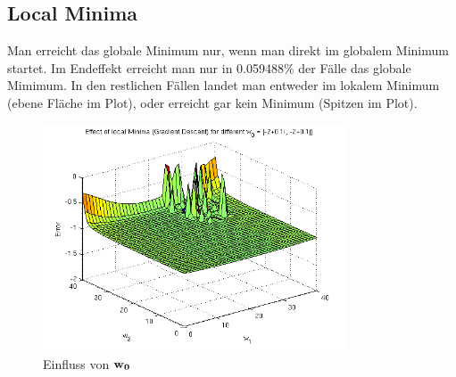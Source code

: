 \clearpage
\newpage
\subsection{Local Minima}

Man erreicht das globale Minimum nur, wenn man direkt im globalem Minimum startet.
Im Endeffekt erreicht man nur in 0.059488\% der Fälle das globale Mimimum. In den restlichen Fällen landet man
entweder im lokalem Minimum (ebene Fläche im Plot), oder erreicht gar kein Minimum (Spitzen im Plot).


\begin{figure}[h!]
  \centering
  \includegraphics[width=0.8\textwidth]{./figures/214/minf.png}
  \caption{Einfluss von $\mathbf{w_0}$}
  \label{fig:minf}
\end{figure}